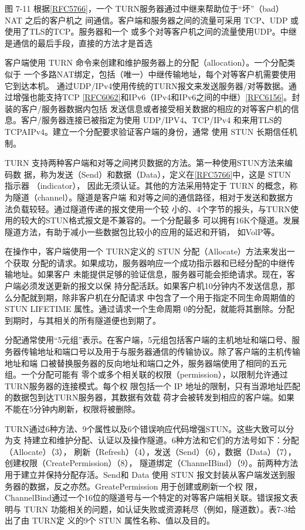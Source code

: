 图 7-11
根据\href{https://www.rfc-editor.org/rfc/rfc5766}{[RFC5766]}，一个 TURN服务器通过中继来帮助位于“坏”（bad） NAT 之后的客户机之
间通信。客户端和服务器之间的流量可采用 TCP、UDP 或使用了TLS的TCP。服务器和一个
或多个对等客户机之间的流量使用UDP。中继是通信的最后手段，直接的方法才是首选

客户端使用 TURN 命令来创建和维护服务器上的分配（allocation）。一个分配类似于
一个多路NAT绑定，包括（唯一）中继传输地址，每个对等客户机需要使用它到达本机。
通过UDP/IPv4使用传统的TURN报文来发送服务器/对等数据。通过增强也能支持TCP
\href{https://www.rfc-editor.org/rfc/rfc6062}{[RFC6062]}和IPv6（IPv4和IPv6之间的中继）\href{https://www.rfc-editor.org/rfc/rfc6156}{[RFC6156]}。封装的客户/服务器数据内包括
发送信息或者接受相关数据的相应的对等客户机的信息。客户/服务器连接已被指定为使用
UDP/IPV4、TCP/IPv4 和来用TLS的TCPAIPv4。建立一个分配要求验证客户端的身份，通常
使用 STUN 长期信任机制。

TURN 支持两种客户端和对等之间拷贝数据的方法。第一种使用STUN方法来编码数
据，称为发送（Send）和数据（Data），定义在\href{https://www.rfc-editor.org/rfc/rfc5766}{[RFC5766]}中，这是 STUN 指示器 （indicator），
因此无须认证。其他的方法采用特定于 TURN 的概念，称为隧道（channel）。隧道是客户端
和对等之间的通信路径，相对于发送和数据方法负载较轻。通过隧道传递的报文使用一个较
小的、4个字节的报头，与TURN使用的较大的STUN格式报文是不兼容的。一个分配最多
可以拥有16K个隧道。发展隧道方法，有助于减小一些数据包比较小的应用的延迟和开销，
如VolP等。

在操作中，客户端使用一个 TURN定义的 STUN 分配（Allocate）方法来发出一个获取
分配的请求。如果成功，服务器响应一个成功指示器和已经分配的中继传输地址。如果客户
未能提供足够的验证信息，服务器可能会拒绝请求。现在，客户端必须发送更新的报文以保
持分配活跃。如果客户机10分钟内不发送信息，那么分配就到期，除非客户机在分配请求
中包含了一个用于指定不同生命周期值的 STUN LIFETIME 属性。通过请求一个生命周期
0的分配，就能将其删除。分配到期时，与其相关的所有隧道便也到期了。

分配通常使用“5元组”表示。在客户端，5元组包括客户端的主机地址和端口号、服
务器传输地址和端口号以及用于与服务器通信的传输协议。除了客户端的主机传输地址和端
口被替换服务器的反向地址和端口之外，服务器端使用了相同的五元组。一个分配可能有
零个或多个相关联的权限（permission），以限制允许通过TURN服务器的连接模式。每个权
限包括一个 IP 地址的限制，只有当源地址匹配的数据包到达TURN服务器，其数据有效载
荷才会被转发到相应的客户端。如果不能在5分钟内刷新，权限将被删除。

TURN通过6种方法、9个属性以及6个错误响应代码增强STUN。这些大致可以分为支
持建立和维护分配、认证以及操作隧道。6种方法和它们的方法号如下：分配（Allocate）（3），
刷新（Refresh）（4），发送（Send）（6），数据（Data）（7），创建权限（CreatePermission）（8），
隧道绑定（ChanneIBind）（9）。前两种方法用于建立并保持分配存活。Send和 Data 使用 STUN
报文封装从客户端发送到服务器的数据，反之亦然。GreatePermission 用于创建或刷新一个权
限，ChannelBind通过一个16位的隧道号与一个特定的对等客户端相关联。错误报文表明与
TURN 功能相关的问题，如认证失败或资源耗尽（例如，隧道数）。表7-3给出了由 TURN定
义的9个 STUN 属性名称、值以及目的。

